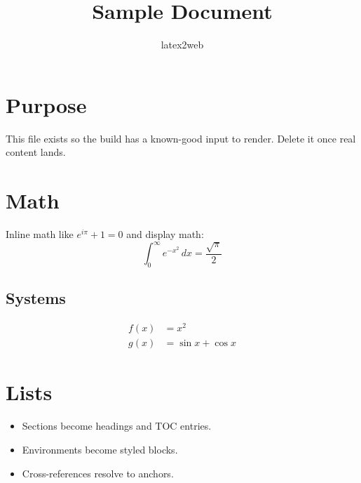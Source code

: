 \documentclass{article}
\title{Sample Document}
\author{latex2web}
\date{}
\begin{document}
\maketitle

\section{Purpose}
This file exists so the build has a known-good input to render.
Delete it once real content lands.

\section{Math}
Inline math like $e^{i\pi} + 1 = 0$ and display math:
\begin{equation}
  \int_0^\infty e^{-x^2}\,dx = \frac{\sqrt{\pi}}{2}
\end{equation}

\subsection{Systems}
\begin{align}
  f(x) &= x^2 \\
  g(x) &= \sin x + \cos x
\end{align}

\section{Lists}
\begin{itemize}
  \item Sections become headings and TOC entries.
  \item Environments become styled blocks.
  \item Cross-references resolve to anchors.
\end{itemize}
\end{document}
